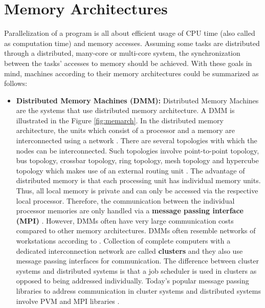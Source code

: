 \section{Memory Architectures} 
Parallelization of a program is all about efficient usage of CPU time (also called as computation time) and memory accesses. Assuming some tasks are distributed through a distributed, many-core or multi-core system, the synchronization between the tasks' accesses to memory should be achieved. With these goals in mind, machines according to their memory architectures could be summarized as follows:
\begin{itemize}
	\item \textbf{Distributed Memory Machines (DMM):} Distributed Memory Machines are the systems that use distributed memory architecture. A DMM is illustrated in the Figure \ref{fig:memarch}. In the distributed memory architecture, the units which consist of a processor and a memory are interconnected using a network \cite{springerparallel}. There are several topologies with which the nodes can be interconnected. Such topologies involve point-to-point topology, bus topology, crossbar topology, ring topology, mesh topology and hypercube topology which makes use of an external routing unit \cite{interconnection}. The advantage of distributed memory is that each processing unit has individual memory units. Thus, all local memory is private and can only be accessed via the respective local processor. Therefore, the communication between the individual processor memories are only handled via a \textbf{message passing interface (MPI)} \cite{springerparallel}. However, DMMs often have very large communication costs compared to other memory architectures. DMMs often resemble networks of workstations according to \cite{springerparallel}. Collection of complete computers with a dedicated interconnection network are called \textbf{clusters} and they also use message passing interfaces for communication. The difference between cluster systems and distributed systems is that a job scheduler is used in clusters as opposed to being addressed individually. Today's popular message passing libraries to address communication in cluster systems and distributed systems involve PVM and MPI libraries \cite{springerparallel}. 

\end{itemize}
